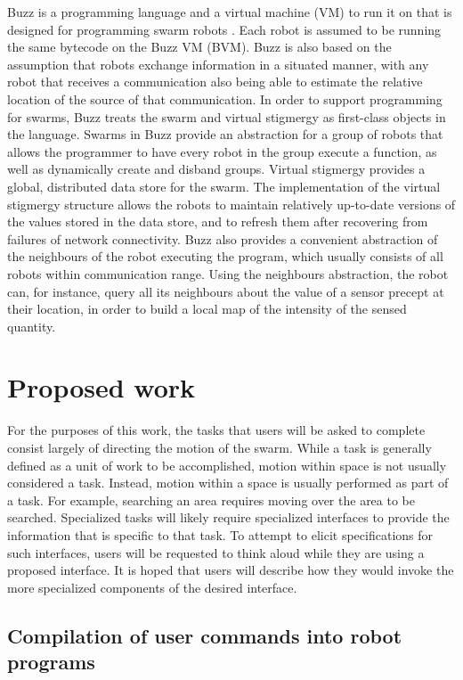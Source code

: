 \documentclass[]{article}
\begin{document}
Buzz is a programming language and a virtual machine (VM) to run it on that is designed for programming swarm robots \cite{PinciroliLB15}. 
Each robot is assumed to be running the same bytecode on the Buzz VM (BVM). 
Buzz is also based on the assumption that robots exchange information in a situated manner, with any robot that receives a communication also being able to estimate the relative location of the source of that communication.
In order to support programming for swarms, Buzz treats the swarm and virtual stigmergy as first-class objects in the language. 
Swarms in Buzz provide an abstraction for a group of robots that allows the programmer to have every robot in the group execute a function, as well as dynamically create and disband groups. 
Virtual stigmergy provides a global, distributed data store for the swarm. 
The implementation of the virtual stigmergy structure allows the robots to maintain relatively up-to-date versions of the values stored in the data store, and to refresh them after recovering from failures of network connectivity.
Buzz also provides a convenient abstraction of the neighbours of the robot executing the program, which usually consists of all robots within communication range. 
Using the neighbours abstraction, the robot can, for instance, query all its neighbours about the value of a sensor precept at their location, in order to build a local map of the intensity of the sensed quantity. 

\section{Proposed work}

For the purposes of this work, the tasks that users will be asked to complete consist largely of directing the motion of the swarm. 
While a task is generally defined as a unit of work to be accomplished, motion within space is not usually considered a task. 
Instead, motion within a space is usually performed as part of a task.
For example, searching an area requires moving over the area to be searched.
Specialized tasks will likely require specialized interfaces to provide the information that is specific to that task. 
To attempt to elicit specifications for such interfaces, users will be requested to think aloud while they are using a proposed interface. 
It is hoped that users will describe how they would invoke the more specialized components of the desired interface. 

\subsection{Compilation of user commands into robot programs}
\end{document}
